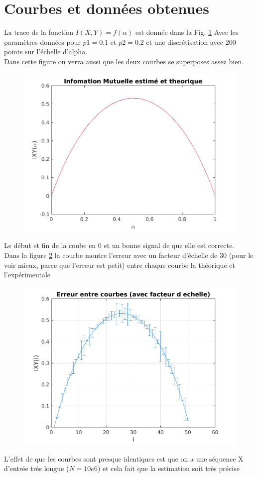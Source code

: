 \documentclass{report}
\begin{document}
\section{Courbes et données obtenues}
La trace de la fonction $I(X,Y)=f(\alpha)$ est donnée dans la Fig. \ref{fig:superposition}
Avec les paramètres données pour $p1 = 0.1$ et $p2 = 0.2$ et une discrétisation avec 200 points sur l'échelle d'alpha.\\
Dans cette figure on verra aussi que les deux courbes se superposes assez bien.
\begin{figure}[h]
	\centering
	\captionsetup{justification=centering}
	\includegraphics[width=0.7\linewidth]{../canal1}
	\caption{}
	\label{fig:superposition}
\end{figure}
Le début et fin de la coube en 0 et un bonne signal de que elle est correcte. \\
Dans la figure \ref{fig:errorsuposition} la courbe montre l'erreur avec un facteur d'échelle de 30 (pour le voir mieux, parce que l'erreur est petit) entre chaque courbe la théorique et l'expérimentale
\begin{figure}[h]
	\centering
	\captionsetup{justification=centering}
	\includegraphics[width=0.5\linewidth]{../canal2}
	\caption{}
	\label{fig:errorsuposition}
\end{figure}
L'effet de que les courbes sont presque identiques est que on a une séquence X d'entrée très longue ($N=10e6$) et cela fait que la estimation soit très précise
\end{document}
